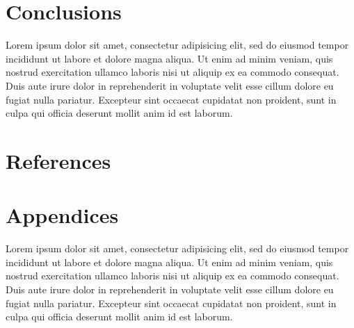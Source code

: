 \documentclass[12pt,a4paper]{article}
\begin{document}
	\section{Conclusions}
		Lorem ipsum dolor sit amet, consectetur adipisicing elit, sed do eiusmod tempor incididunt ut labore et dolore magna aliqua. Ut enim ad minim veniam, quis nostrud exercitation ullamco laboris nisi ut aliquip ex ea commodo consequat. Duis aute irure dolor in reprehenderit in voluptate velit esse cillum dolore eu fugiat nulla pariatur. Excepteur sint occaecat cupidatat non proident, sunt in culpa qui officia deserunt mollit anim id est laborum.
		\clearpage
	\section{References}
		\printbibliography[heading=none]
		\clearpage
	\section{Appendices}
		Lorem ipsum dolor sit amet, consectetur adipisicing elit, sed do eiusmod tempor incididunt ut labore et dolore magna aliqua. Ut enim ad minim veniam, quis nostrud exercitation ullamco laboris nisi ut aliquip ex ea commodo consequat. Duis aute irure dolor in reprehenderit in voluptate velit esse cillum dolore eu fugiat nulla pariatur. Excepteur sint occaecat cupidatat non proident, sunt in culpa qui officia deserunt mollit anim id est laborum.
\end{document}
